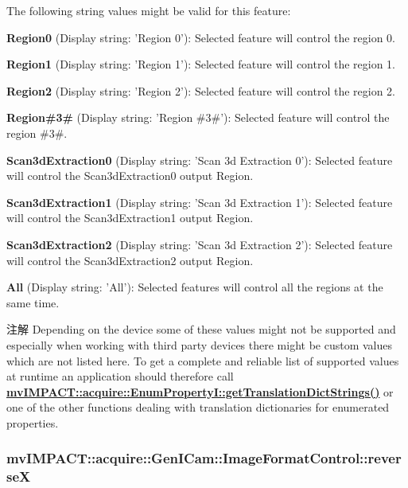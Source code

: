 The following string values might be valid for this feature\+:
\begin{DoxyItemize}
\item {\bfseries Region0} (Display string\+: 'Region 0')\+: Selected feature will control the region 0.
\item {\bfseries Region1} (Display string\+: 'Region 1')\+: Selected feature will control the region 1.
\item {\bfseries Region2} (Display string\+: 'Region 2')\+: Selected feature will control the region 2.
\item {\bfseries Region\#3\#} (Display string\+: 'Region \#3\#')\+: Selected feature will control the region \#3\#.
\item {\bfseries Scan3d\+Extraction0} (Display string\+: 'Scan 3d Extraction 0')\+: Selected feature will control the Scan3d\+Extraction0 output Region.
\item {\bfseries Scan3d\+Extraction1} (Display string\+: 'Scan 3d Extraction 1')\+: Selected feature will control the Scan3d\+Extraction1 output Region.
\item {\bfseries Scan3d\+Extraction2} (Display string\+: 'Scan 3d Extraction 2')\+: Selected feature will control the Scan3d\+Extraction2 output Region.
\item {\bfseries All} (Display string\+: 'All')\+: Selected features will control all the regions at the same time.
\end{DoxyItemize}

\begin{DoxyNote}{注解}
Depending on the device some of these values might not be supported and especially when working with third party devices there might be custom values which are not listed here. To get a complete and reliable list of supported values at runtime an application should therefore call {\bfseries \hyperlink{classmv_i_m_p_a_c_t_1_1acquire_1_1_enum_property_i_a0ba6ccbf5ee69784d5d0b537924d26b6}{mv\+I\+M\+P\+A\+C\+T\+::acquire\+::\+Enum\+Property\+I\+::get\+Translation\+Dict\+Strings()}} or one of the other functions dealing with translation dictionaries for enumerated properties. 
\end{DoxyNote}
\hypertarget{classmv_i_m_p_a_c_t_1_1acquire_1_1_gen_i_cam_1_1_image_format_control_a53ced6d3112b74803251afaad3bfe073}{
\subsubsection[{reverse\+X}]{ mv\+I\+M\+P\+A\+C\+T\+::acquire\+::\+Gen\+I\+Cam\+::\+Image\+Format\+Control\+::reverse\+X}}\label{classmv_i_m_p_a_c_t_1_1acquire_1_1_gen_i_cam_1_1_image_format_control_a53ced6d3112b74803251afaad3bfe073}


